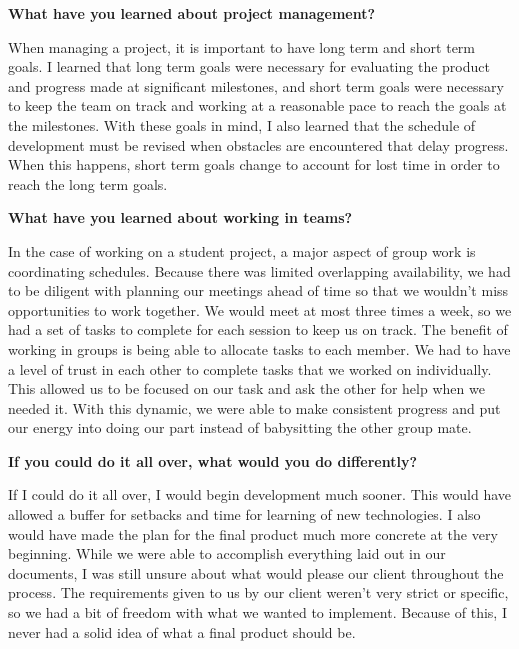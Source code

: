 \documentclass[onecolumn, draftclsnofoot,10pt, compsoc]{IEEEtran}
\begin{document}
\begin{flushleft}
\textbf{What have you learned about project management?}\par
When managing a project, it is important to have long term and short term goals. I learned that long term goals were necessary for evaluating the product and progress made at significant milestones, and short term goals were necessary to keep the team on track and working at a reasonable pace to reach the goals at the milestones. With these goals in mind, I also learned that the schedule of development must be revised when obstacles are encountered that delay progress. When this happens, short term goals change to account for lost time in order to reach the long term goals.

\textbf{What have you learned about working in teams?}\par
In the case of working on a student project, a major aspect of group work is coordinating schedules. Because there was limited overlapping availability, we had to be diligent with planning our meetings ahead of time so that we wouldn't miss opportunities to work together. We would meet at most three times a week, so we had a set of tasks to complete for each session to keep us on track. The benefit of working in groups is being able to allocate tasks to each member. We had to have a level of trust in each other to complete tasks that we worked on individually. This allowed us to be focused on our task and ask the other for help when we needed it. With this dynamic, we were able to make consistent progress and put our energy into doing our part instead of babysitting the other group mate.

\textbf{If you could do it all over, what would you do differently?}\par
If I could do it all over, I would begin development much sooner. This would have allowed a buffer for setbacks and time for learning of new technologies. I also would have made the plan for the final product much more concrete at the very beginning. While we were able to accomplish everything laid out in our documents, I was still unsure about what would please our client throughout the process. The requirements given to us by our client weren't very strict or specific, so we had a bit of freedom with what we wanted to implement. Because of this, I never had a solid idea of what a final product should be.

\end{flushleft}
\end{document}
